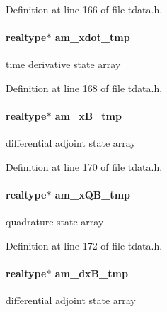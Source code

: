 Definition at line 166 of file tdata.\+h.

\hypertarget{struct_temp_data_ac28b5a5a19ad2004d32d20098d3603ed}{}
\paragraph[{am\+\_\+xdot\+\_\+tmp}]{\setlength{\rightskip}{0pt plus 5cm}realtype$\ast$ am\+\_\+xdot\+\_\+tmp}\label{struct_temp_data_ac28b5a5a19ad2004d32d20098d3603ed}
time derivative state array 

Definition at line 168 of file tdata.\+h.

\hypertarget{struct_temp_data_a71147dc6b9970cafbada503f873d0dfe}{}
\paragraph[{am\+\_\+x\+B\+\_\+tmp}]{\setlength{\rightskip}{0pt plus 5cm}realtype$\ast$ am\+\_\+x\+B\+\_\+tmp}\label{struct_temp_data_a71147dc6b9970cafbada503f873d0dfe}
differential adjoint state array 

Definition at line 170 of file tdata.\+h.

\hypertarget{struct_temp_data_a18e2184588648670c2df22856f441e32}{}
\paragraph[{am\+\_\+x\+Q\+B\+\_\+tmp}]{\setlength{\rightskip}{0pt plus 5cm}realtype$\ast$ am\+\_\+x\+Q\+B\+\_\+tmp}\label{struct_temp_data_a18e2184588648670c2df22856f441e32}
quadrature state array 

Definition at line 172 of file tdata.\+h.

\hypertarget{struct_temp_data_a147fbb5ac85bc9ce0f55cb9108663e1b}{}
\paragraph[{am\+\_\+dx\+B\+\_\+tmp}]{\setlength{\rightskip}{0pt plus 5cm}realtype$\ast$ am\+\_\+dx\+B\+\_\+tmp}\label{struct_temp_data_a147fbb5ac85bc9ce0f55cb9108663e1b}
differential adjoint state array 

